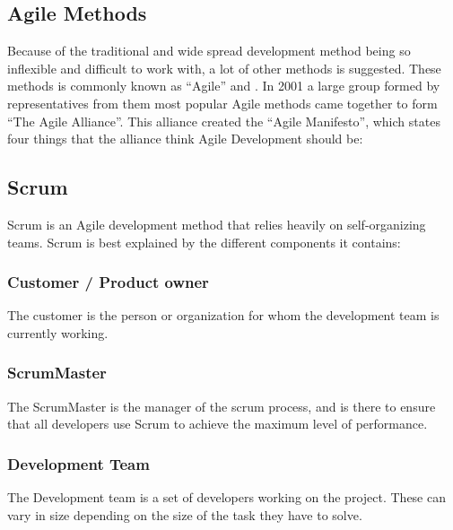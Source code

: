 \subsection{Agile Methods}
Because of the traditional and wide spread development method being so inflexible and difficult to work with, a lot of other methods is suggested.
These methods is commonly known as ``Agile'' \cite{agileManifesto} and \cite{agilepyra}.
In 2001 a large group formed by representatives from them most popular Agile methods came together to form ``The Agile Alliance''.
This alliance created the ``Agile Manifesto'', which states four things that the alliance think Agile Development should be:


\subsection{Scrum}
Scrum is an Agile development method that relies heavily on self-organizing teams. Scrum is best explained by the different components it contains:

\subsubsection{Customer / Product owner}
The customer is the person or organization for whom the development team is currently working.

\subsubsection{ScrumMaster}
The ScrumMaster is the manager of the scrum process, and is there to ensure that all developers use Scrum to achieve the maximum level of performance.

\subsubsection{Development Team}
The Development team is a set of developers working on the project. These can vary in size depending on the size of the task they have to solve.

